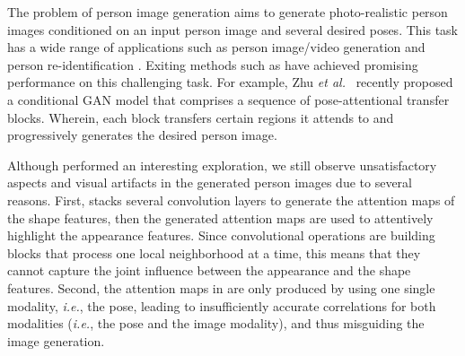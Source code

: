 \documentclass[runningheads]{llncs}
\begin{document}
The problem of person image generation aims to generate photo-realistic person images conditioned on an input person image and several desired poses.
This task has a wide range of applications such as person image/video generation \cite{yang2018pose,grigorev2019coordinate,balakrishnan2018synthesizing,ilyes2018pose,liu2019liquid} and person re-identification \cite{zhu2019progressive,qian2018pose}.
Exiting methods such as \cite{ma2017pose,ma2018disentangled,siarohin2018deformable,zhu2019progressive,tang2019cycle} have achieved promising performance on this challenging task.
For example, Zhu \emph{et al.}~\cite{zhu2019progressive} recently proposed a conditional GAN model that comprises a sequence of pose-attentional transfer blocks. Wherein, each block transfers certain regions it attends to and progressively generates the desired person image.

Although \cite{zhu2019progressive} performed an interesting exploration, we still observe unsatisfactory aspects and visual artifacts in the generated person images due to several reasons.
First, \cite{zhu2019progressive} stacks several convolution layers to generate the attention maps of the shape features, then the generated attention maps are used to attentively highlight the appearance features.
Since convolutional operations are building blocks that process one local neighborhood at a time, this means that they cannot capture the joint influence between the appearance and the shape features.
Second, the attention maps in \cite{zhu2019progressive} are only produced by using one single modality, \emph{i.e.}, the pose, leading to insufficiently accurate correlations for both modalities (\emph{i.e.}, the pose and the image modality), and thus misguiding the image generation. 
\end{document}
